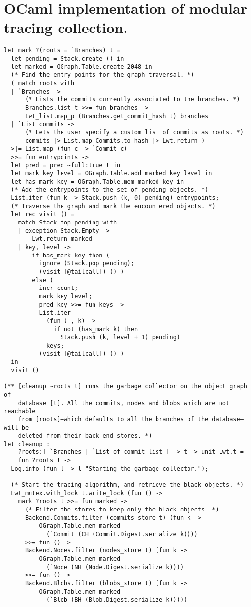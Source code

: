 \section{OCaml implementation of modular tracing collection.}
\label{app:modular-tracing}

\begin{verbatim}
let mark ?(roots = `Branches) t =
  let pending = Stack.create () in
  let marked = OGraph.Table.create 2048 in
  (* Find the entry-points for the graph traversal. *)
  ( match roots with
  | `Branches ->
      (* Lists the commits currently associated to the branches. *)
      Branches.list t >>= fun branches ->
      Lwt_list.map_p (Branches.get_commit_hash t) branches
  | `List commits ->
      (* Lets the user specify a custom list of commits as roots. *)
      commits |> List.map Commits.to_hash |> Lwt.return )
  >|= List.map (fun c -> `Commit c)
  >>= fun entrypoints ->
  let pred = pred ~full:true t in
  let mark key level = OGraph.Table.add marked key level in
  let has_mark key = OGraph.Table.mem marked key in
  (* Add the entrypoints to the set of pending objects. *)
  List.iter (fun k -> Stack.push (k, 0) pending) entrypoints;
  (* Traverse the graph and mark the encountered objects. *)
  let rec visit () =
    match Stack.top pending with
    | exception Stack.Empty ->
        Lwt.return marked
    | key, level ->
        if has_mark key then (
          ignore (Stack.pop pending);
          (visit [@tailcall]) () )
        else (
          incr count;
          mark key level;
          pred key >>= fun keys ->
          List.iter
            (fun (_, k) ->
              if not (has_mark k) then
                Stack.push (k, level + 1) pending)
            keys;
          (visit [@tailcall]) () )
  in
  visit ()

(** [cleanup ~roots t] runs the garbage collector on the object graph of
    database [t]. All the commits, nodes and blobs which are not reachable
    from [roots]–which defaults to all the branches of the database–will be
    deleted from their back-end stores. *)
let cleanup :
    ?roots:[ `Branches | `List of commit list ] -> t -> unit Lwt.t =
    fun ?roots t ->
  Log.info (fun l -> l "Starting the garbage collector.");

  (* Start the tracing algorithm, and retrieve the black objects. *)
  Lwt_mutex.with_lock t.write_lock (fun () ->
    mark ?roots t >>= fun marked ->
      (* Filter the stores to keep only the black objects. *)
      Backend.Commits.filter (commits_store t) (fun k ->
          OGraph.Table.mem marked
            (`Commit (CH (Commit.Digest.serialize k))))
      >>= fun () ->
      Backend.Nodes.filter (nodes_store t) (fun k ->
          OGraph.Table.mem marked
            (`Node (NH (Node.Digest.serialize k))))
      >>= fun () ->
      Backend.Blobs.filter (blobs_store t) (fun k ->
          OGraph.Table.mem marked
            (`Blob (BH (Blob.Digest.serialize k)))))
\end{verbatim}